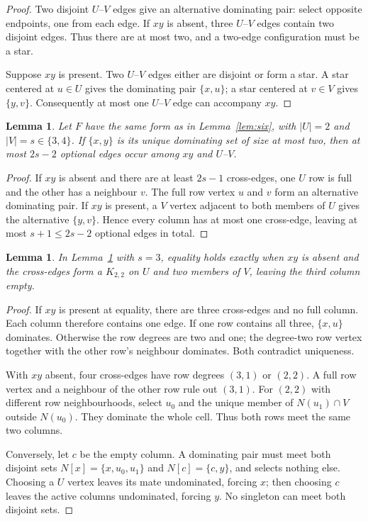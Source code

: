 \documentclass[11pt]{article}
\newtheorem{lemma}[theorem]{Lemma}
\theoremstyle{definition}
\theoremstyle{remark}
\begin{document}
\begin{proof}
Two disjoint $U$--$V$ edges give an alternative dominating pair: select
opposite endpoints, one from each edge. If $xy$ is absent, three
$U$--$V$ edges contain two disjoint edges. Thus there are at most two, and a
two-edge configuration must be a star.

Suppose $xy$ is present. Two $U$--$V$ edges either are disjoint or form a
star. A star centered at $u\in U$ gives the dominating pair $\{x,u\}$;
a star centered at $v\in V$ gives $\{y,v\}$. Consequently at most one
$U$--$V$ edge can accompany $xy$.
\end{proof}

\begin{lemma}\label{lem:seven}
Let $F$ have the same form as in Lemma~\ref{lem:six}, with $|U|=2$ and
$|V|=s\in\{3,4\}$. If $\{x,y\}$ is its unique dominating set of size at
most two, then at most $2s-2$ optional edges occur among $xy$ and $U$--$V$.
\end{lemma}

\begin{proof}
If $xy$ is absent and there are at least $2s-1$ cross-edges, one $U$ row
is full and the other has a neighbour $v$. The full row vertex $u$ and $v$
form an alternative dominating pair. If $xy$ is present, a $V$ vertex
adjacent to both members of $U$ gives the alternative $\{y,v\}$.
Hence every column has at most one cross-edge, leaving at most
$s+1\le2s-2$ optional edges in total.
\end{proof}

\begin{lemma}\label{lem:seven-equality}
In Lemma~\ref{lem:seven} with $s=3$, equality holds exactly when $xy$ is
absent and the cross-edges form a $K_{2,2}$ on $U$ and two members of $V$,
leaving the third column empty.
\end{lemma}

\begin{proof}
If $xy$ is present at equality, there are three cross-edges and no full
column. Each column therefore contains one edge. If one row contains all
three, $\{x,u\}$ dominates. Otherwise the row degrees are two and one;
the degree-two row vertex together with the other row's neighbour dominates.
Both contradict uniqueness.

With $xy$ absent, four cross-edges have row degrees $(3,1)$ or $(2,2)$.
A full row vertex and a neighbour of the other row rule out $(3,1)$.
For $(2,2)$ with different row neighbourhoods, select $u_0$ and the unique
member of $N(u_1)\cap V$ outside $N(u_0)$. They dominate the whole cell.
Thus both rows meet the same two columns.

Conversely, let $c$ be the empty column. A dominating pair must meet both
disjoint sets $N[x]=\{x,u_0,u_1\}$ and $N[c]=\{c,y\}$, and selects nothing
else. Choosing a $U$ vertex leaves its mate undominated, forcing $x$;
then choosing $c$ leaves the active columns undominated, forcing $y$.
No singleton can meet both disjoint sets.
\end{proof}
\end{document}
